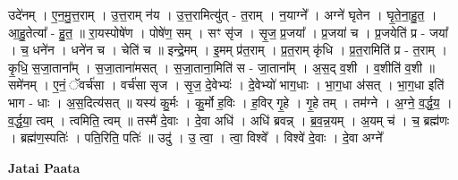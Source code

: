 \documentclass[17pt]{extarticle}
\begin{document}
उदे॑नम् । ए॒न॒मु॒त्त॒राम् । उ॒त्त॒राम् न॑य । उ॒त्त॒रामित्यु॑त् - त॒राम् । न॒याग्ने᳚ । अग्ने॑ घृतेन । घृ॒ते॒ना॒हु॒त॒ । आ॒हु॒तेत्या᳚ - हु॒त॒ ॥ रा॒यस्पोषे॑ण । पोषे॑ण॒ सम् । सꣳ सृ॑ज । सृ॒ज॒ प्र॒जया᳚ । प्र॒जया॑ च । प्र॒जयेति॑ प्र - जया᳚ । च॒ धने॑न । धने॑न च । चेति॑ च ॥ इन्द्रे॒मम् । इ॒मम् प्र॑त॒राम् । प्र॒त॒राम् कृ॑धि । प्र॒त॒रामिति॑ प्र - त॒राम् । कृ॒धि॒ स॒जा॒ताना᳚म् । स॒जा॒ताना॑मसत् । स॒जा॒ताना॒मिति॑ स - जा॒ताना᳚म् । अ॒स॒द् व॒शी । व॒शीति॑ व॒शी ॥ समे॑नम् । ए॒नं॒ ॅवर्च॑सा । वर्च॑सा सृज । सृ॒ज॒ दे॒वेभ्यः॑ । दे॒वेभ्यो॑ भाग॒धाः । भा॒ग॒धा अ॑सत् । भा॒ग॒धा इति॑ भाग - धाः । अ॒स॒दित्य॑सत् ॥ यस्य॑ कु॒र्मः । कु॒र्मो ह॒विः । ह॒विर् गृ॒हे । गृ॒हे तम् । तम॑ग्ने । अ॒ग्ने॒ व॒र्द्ध॒य॒ । व॒र्द्ध॒या॒ त्वम् । त्वमिति॒ त्वम् ॥ तस्मै॑ दे॒वाः । दे॒वा अधि॑ । अधि॑ ब्रवन्न् । ब्र॒व॒न्न॒यम् । अ॒यम् च॑ । च॒ ब्रह्म॑णः । ब्रह्म॑ण॒स्पतिः॑ । पति॒रिति॒ पतिः॑ ॥ उदु॑ । उ॒ त्वा॒ । त्वा॒ विश्वे᳚ । विश्वे॑ दे॒वाः । दे॒वा अग्ने᳚ \newline

\textbf{Jatai Paata} \newline
\end{document}
